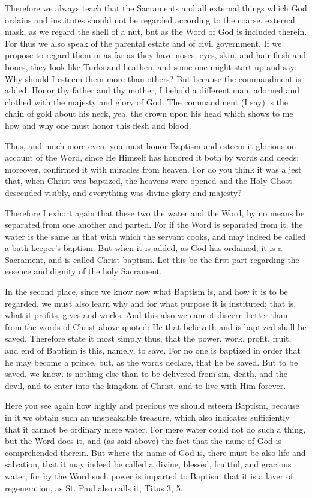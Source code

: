 Therefore we always teach that the Sacraments and all external things
which God ordains and institutes should not be regarded according to
the coarse, external mask, as we regard the shell of a nut, but as the
Word of God is included therein. For thus we also speak of the parental
estate and of civil government. If we propose to regard them in as far
as they have noses, eyes, skin, and hair flesh and bones, they look
like Turks and heathen, and some one might start up and say: Why should
I esteem them more than others? But because the commandment is added:
Honor thy father and thy mother, I behold a different man, adorned and
clothed with the majesty and glory of God. The commandment (I say) is
the chain of gold about his neck, yea, the crown upon his head which
shows to me how and why one must honor this flesh and blood.

Thus, and much more even, you must honor Baptism and esteem it
glorious on account of the Word, since He Himself has honored it both
by words and deeds; moreover, confirmed it with miracles from heaven.
For do you think it was a jest that, when Christ was baptized, the
heavens were opened and the Holy Ghost descended visibly, and
everything was divine glory and majesty?

Therefore I exhort again that these two the water and the Word, by no
means be separated from one another and parted. For if the Word is
separated from it, the water is the same as that with which the servant
cooks, and may indeed be called a bath-keeper's baptism. But when it is
added, as God has ordained, it is a Sacrament, and is called
Christ-baptism. Let this be the first part regarding the essence and
dignity of the holy Sacrament.

In the second place, since we know now what Baptism is, and how it is
to be regarded, we must also learn why and for what purpose it is
instituted; that is, what it profits, gives and works. And this also we
cannot discern better than from the words of Christ above quoted: He
that believeth and is baptized shall be saved. Therefore state it most
simply thus, that the power, work, profit, fruit, and end of Baptism is
this, namely, to save. For no one is baptized in order that he may
become a prince, but, as the words declare, that he be saved. But to be
saved. we know. is nothing else than to be delivered from sin, death,
and the devil, and to enter into the kingdom of Christ, and to live
with Him forever.

Here you see again how highly and precious we should esteem Baptism,
because in it we obtain such an unspeakable treasure, which also
indicates sufficiently that it cannot be ordinary mere water. For mere
water could not do such a thing, but the Word does it, and (as said
above) the fact that the name of God is comprehended therein. But where
the name of God is, there must be also life and salvation, that it may
indeed be called a divine, blessed, fruitful, and gracious water; for
by the Word such power is imparted to Baptism that it is a laver of
regeneration, as St. Paul also calls it, Titus 3, 5.

